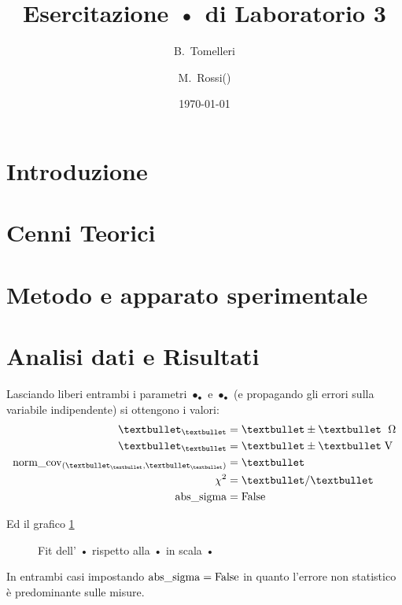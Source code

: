 \documentclass{article}[a4paper, 12pt, italian]
\title{Esercitazione • di Laboratorio 3}
\author{B.~Tomelleri\thanksdf \and M.~Rossi(\protect\footnotemark[1] )}
\date{\today}
\begin{document}
\maketitle

\section{Introduzione}

\section{Cenni Teorici}

\section{Metodo e apparato sperimentale}

\section{Analisi dati e Risultati}

Lasciando liberi entrambi i parametri $•_{•}$ e $•_{•}$ (e propagando
gli errori sulla variabile indipendente) si ottengono i valori:
\begin{align*}
•_{•} &= • \pm • \ \; \si{\ohm} \\
•_{•} &= • \pm • \; \si{\volt} \\  
\rm{norm\_cov}_{(•_{•}, •_{•})} &= • \\ 
\chi^2 &= •/• \\
\rm{abs\_sigma} &= \rm False
\end{align*}

Ed il grafico \ref{plt:1}\\
\begin{figure}[!htb]
	\centering 
 	\caption{Fit dell' • rispetto alla • in scala • \label{plt:1}}
\end{figure}
In entrambi casi impostando $\rm{abs\_sigma} = \rm False$ in quanto l'errore
non statistico è predominante sulle misure.
\end{document}

